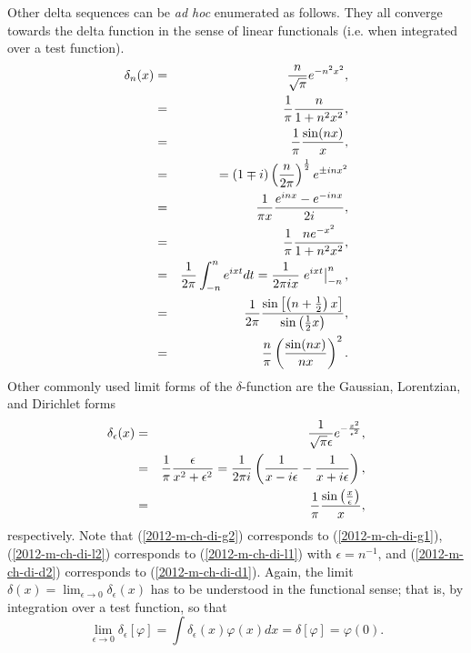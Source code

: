 Other delta sequences can be {\it ad hoc}  enumerated as follows.
They all converge towards the delta function in the sense of linear functionals (i.e. when integrated over a test function).
\begin{eqnarray}
\delta_n(x)
&=& \frac{n}{\sqrt{\pi}} e^{-n^2 x^2},
\label{2012-m-ch-di-g1}\\
&=&
\frac{1}{\pi}\frac{n}{1+ n^2x^2},    \label{2012-m-ch-di-l1} \\
&=&
\frac{1}{\pi}   \frac{\sin (n x)}{ x}, \label{2012-m-ch-di-d1}\\
&=&
= (1\mp i)\left( {n\over 2\pi }\right)^{1\over 2} e^{\pm inx^2}  \\
&=&
\frac{1}{\pi x}  \frac{e^{inx}-e^{-inx}}{2i} ,\\
&=&
\frac{1}{\pi}  \frac{n  e^{-x^2}}{1+n^2x^2} ,\\
&=&
\frac{1}{2\pi } \int_{-n}^n e^{ixt} dt  = \frac{1}{2\pi i x} \left. e^{ixt}\right|_{-n}^n    ,\\
&=&
\frac{1}{2\pi} \frac{\sin \left[\left( n+\frac{1}{2}\right) x \right]  }{\sin \left( \frac{1}{2}x \right)   },\\
&=&
\frac{n}{ \pi}\left(\frac{\sin (nx)}{nx}\right)^2.
\end{eqnarray}
Other commonly used limit forms of the $\delta $-function are the Gaussian, Lorentzian, and Dirichlet forms
\begin{eqnarray}
\delta_\epsilon (x) &=&   \frac{1}{\sqrt{\pi } \epsilon } e^{-\frac{x^2}{\epsilon^2}} ,
\label{2012-m-ch-di-g2} \\
&=&  \frac{1}{\pi} \frac{\epsilon }{x^2+\epsilon^2}
=   {1\over 2\pi i}
\left(
{1 \over x-i\epsilon }
-
{1 \over x+i\epsilon }
 \right)
 , \label{2012-m-ch-di-l2}  \\
&=&  \frac{1}{\pi } \frac{\sin \left(\frac{x}{\epsilon }\right)}{x} ,  \label{2012-m-ch-di-d2}
\end{eqnarray}
respectively.
Note that
(\ref{2012-m-ch-di-g2}) corresponds to (\ref{2012-m-ch-di-g1}),
(\ref{2012-m-ch-di-l2}) corresponds to (\ref{2012-m-ch-di-l1}) with $\epsilon=n^{-1}$,
and
(\ref{2012-m-ch-di-d2}) corresponds to (\ref{2012-m-ch-di-d1}).
Again, the limit
$
\delta (x)= \lim_{\epsilon \rightarrow 0} \delta_\epsilon (x)
$
has to be understood in the functional sense; that is, by integration over a test function,
so that
\begin{equation}
\lim_{\epsilon \rightarrow 0} \delta_\epsilon [\varphi]=
\int \delta_\epsilon (x) \varphi (x) dx  =    \delta [\varphi]=\varphi (0).
\end{equation}





